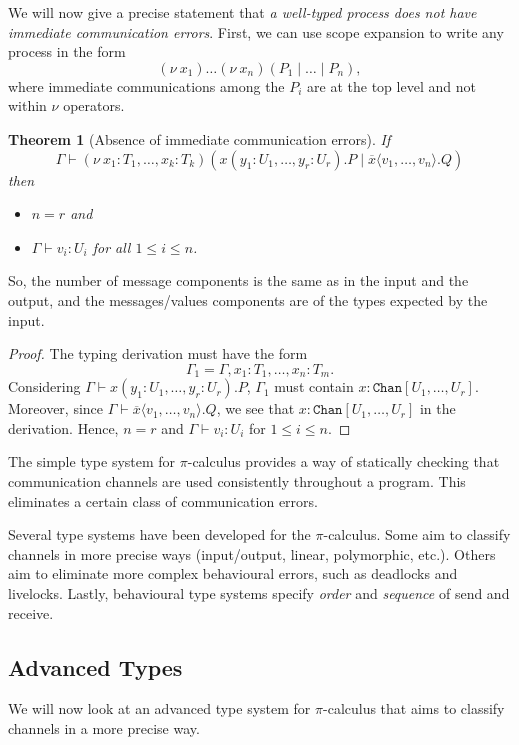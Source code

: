 \documentclass[a4paper, openany]{memoir}
\newtheorem{theorem}[proposition]{Theorem}
\theoremstyle{definition}
\begin{document}
    We will now give a precise statement that \emph{a well-typed process does not have immediate communication errors}. First, we can use scope expansion to write any process in the form
    \[(\nu \ x_1) \dots (\nu \ x_n)(P_1 \mid \dots \mid P_n),\]
    where immediate communications among the $P_i$ are at the top level and not within $\nu$ operators.
    \begin{theorem}[Absence of immediate communication errors]
        If 
        \[\Gamma \vdash (\nu \ x_1 \colon T_1, \dots, x_k \colon T_k)(x(y_1 \colon U_1, \dots, y_r \colon U_r).P \mid \overline{x} \langle v_1, \dots, v_n \rangle.Q)\]
        then
        \begin{itemize}
            \item $n = r$ and
            \item $\Gamma \vdash v_i \colon U_i$ for all $1 \leq i \leq n$.
        \end{itemize}
    \end{theorem}
    \noindent So, the number of message components is the same as in the input and the output, and the messages/values components are of the types expected by the input.
    \begin{proof}
        The typing derivation must have the form
        \[\Gamma_1 = \Gamma, x_1 \colon T_1, \dots, x_n \colon T_m.\]
        Considering $\Gamma \vdash x(y_1 \colon U_1, \dots, y_r \colon U_r).P$, $\Gamma_1$ must contain $x \colon \texttt{Chan}[U_1, \dots, U_r]$. Moreover, since $\Gamma \vdash \overline{x} \langle v_1, \dots, v_n \rangle.Q$, we see that $x \colon \texttt{Chan}[U_1, \dots, U_r]$ in the derivation. Hence, $n = r$ and $\Gamma \vdash v_i \colon U_i$ for $1 \leq i \leq n$.
    \end{proof}

    The simple type system for $\pi$-calculus provides a way of statically checking that communication channels are used consistently throughout a program. This eliminates a certain class of communication errors.
    
    Several type systems have been developed for the $\pi$-calculus. Some aim to classify channels in more precise ways (input/output, linear, polymorphic, etc.). Others aim to eliminate more complex behavioural errors, such as deadlocks and livelocks. Lastly, behavioural type systems specify \emph{order} and \emph{sequence} of send and receive.
    
    \subsection{Advanced Types}
    We will now look at an advanced type system for $\pi$-calculus that aims to classify channels in a more precise way.
\end{document}
